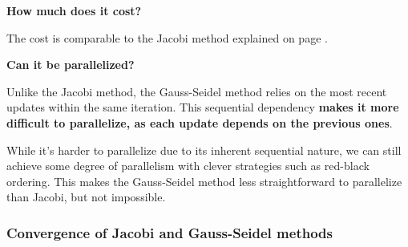 \highspace
\begin{flushleft}
    \textcolor{Red2}{ \textbf{How much does it cost?}}
\end{flushleft}
The cost is comparable to the Jacobi method explained on page \pageref{general-ref: cost jacobi method}.

\highspace
\begin{flushleft}
    \textcolor{Green3}{ \textbf{Can it be parallelized?}}
\end{flushleft}
Unlike the Jacobi method, the Gauss-Seidel method relies on the most recent updates within the same iteration. This sequential dependency \textbf{makes it more difficult to parallelize, as each update depends on the previous ones}.

\highspace
While it's harder to parallelize due to its inherent sequential nature, we can still achieve some degree of parallelism with clever strategies such as red-black ordering. This makes the Gauss-Seidel method less straightforward to parallelize than Jacobi, but not impossible.

\newpage

\subsubsection{Convergence of Jacobi and Gauss-Seidel methods}

